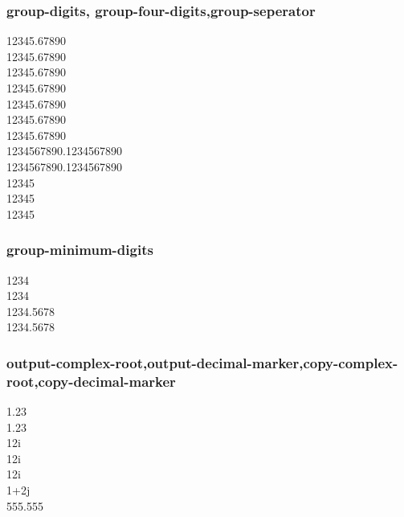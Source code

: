 \documentclass{article}
\begin{document}
\subsubsection{group-digits, group-four-digits,group-seperator}
\num{12345.67890}\\
\num[group-digits= false]{12345.67890}\\
\num[group-digits= decimal]{12345.67890} \\
\num[group-digits= integer]{12345.67890}\\

\num[group-digits= false]{12345.67890}\\
\num[group-digits= decimal]{12345.67890} \\
\num[group-digits= integer]{12345.67890}\\

\num{1234567890.1234567890}\\
\num[group-four-digits]{1234567890.1234567890}\\

\num{12345} \\
\num[group-separator = {,}]{12345} \\
\num[group-separator = \text{~}]{12345}\\

\subsubsection{group-minimum-digits}
\num{1234} \\
\num[group-minimum-digits = 4]{1234} \\
\num{1234.5678} \\
\num[group-minimum-digits = 4]{1234.5678}\\

\subsubsection{output-complex-root,output-decimal-marker,copy-complex-root,copy-decimal-marker}
\num{1.23} \\
\num[output-decimal-marker = {,}]{1.23} \\
\num{1+2i} \\
\num[output-complex-root = \text{\ensuremath{i}}]{1+2i} \\
\num[output-complex-root = j]{1+2i} \\
\num[copy-complex-root]{1+2j} \\
\num[copy-decimal-marker]{555,555}\\
\end{document}
